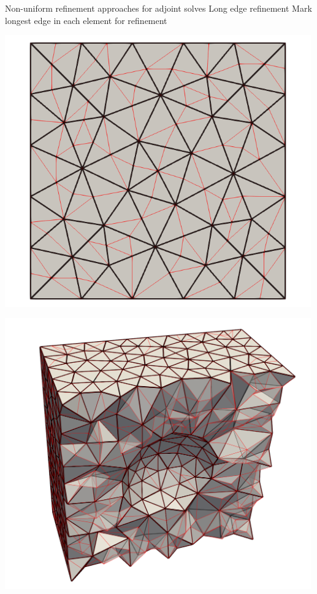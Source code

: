 \documentclass[fleqn]{beamer}
\begin{document}
\begin{frame}{Non-uniform refinement approaches for adjoint solves}
{Long edge refinement}
Mark longest edge in each element for refinement
\begin{minipage}{0.5\textwidth}
\centering
\includegraphics[width=0.99\textwidth]{../img/refine_long_mesh}
\end{minipage}%
\begin{minipage}{0.5\textwidth}
\centering
\includegraphics[width=0.99\textwidth]{../img/refine_long_mesh_3D}
\end{minipage}
\end{frame}
\end{document}
